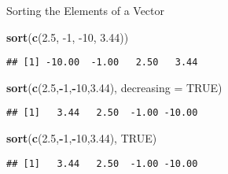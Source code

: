 \documentclass[ignorenonframetext,]{beamer}
\newenvironment{Shaded}{\begin{snugshade}}{\end{snugshade}}
\newcommand{\DataTypeTok}[1]{\textcolor[rgb]{0.13,0.29,0.53}{#1}}
\newcommand{\DecValTok}[1]{\textcolor[rgb]{0.00,0.00,0.81}{#1}}
\newcommand{\FloatTok}[1]{\textcolor[rgb]{0.00,0.00,0.81}{#1}}
\newcommand{\KeywordTok}[1]{\textcolor[rgb]{0.13,0.29,0.53}{\textbf{#1}}}
\newcommand{\NormalTok}[1]{#1}
\newcommand{\OperatorTok}[1]{\textcolor[rgb]{0.81,0.36,0.00}{\textbf{#1}}}
\newcommand{\OtherTok}[1]{\textcolor[rgb]{0.56,0.35,0.01}{#1}}
\begin{document}
\begin{frame}[fragile]{Sorting the Elements of a Vector}
\protect\hypertarget{sorting-the-elements-of-a-vector-1}{}

\begin{Shaded}
\begin{Highlighting}[]
\KeywordTok{sort}\NormalTok{(}\KeywordTok{c}\NormalTok{(}\FloatTok{2.5}\NormalTok{, }\DecValTok{-1}\NormalTok{, }\DecValTok{-10}\NormalTok{, }\FloatTok{3.44}\NormalTok{))}
\end{Highlighting}
\end{Shaded}

\begin{verbatim}
## [1] -10.00  -1.00   2.50   3.44
\end{verbatim}

\begin{Shaded}
\begin{Highlighting}[]
\KeywordTok{sort}\NormalTok{(}\KeywordTok{c}\NormalTok{(}\FloatTok{2.5}\NormalTok{,}\OperatorTok{-}\DecValTok{1}\NormalTok{,}\OperatorTok{-}\DecValTok{10}\NormalTok{,}\FloatTok{3.44}\NormalTok{), }\DataTypeTok{decreasing =} \OtherTok{TRUE}\NormalTok{)}
\end{Highlighting}
\end{Shaded}

\begin{verbatim}
## [1]   3.44   2.50  -1.00 -10.00
\end{verbatim}

\begin{Shaded}
\begin{Highlighting}[]
\KeywordTok{sort}\NormalTok{(}\KeywordTok{c}\NormalTok{(}\FloatTok{2.5}\NormalTok{,}\OperatorTok{-}\DecValTok{1}\NormalTok{,}\OperatorTok{-}\DecValTok{10}\NormalTok{,}\FloatTok{3.44}\NormalTok{), }\OtherTok{TRUE}\NormalTok{)}
\end{Highlighting}
\end{Shaded}

\begin{verbatim}
## [1]   3.44   2.50  -1.00 -10.00
\end{verbatim}

\end{frame}
\end{document}
